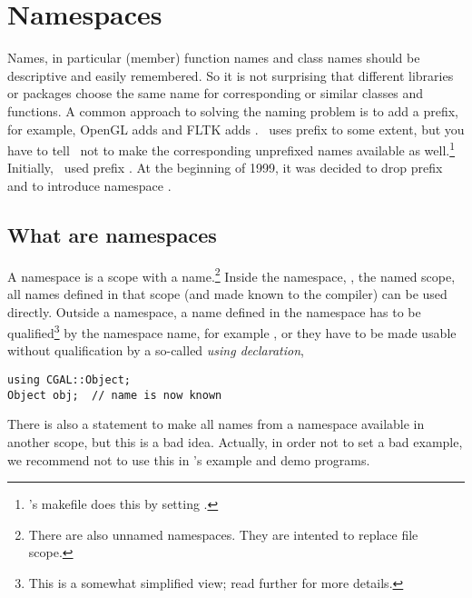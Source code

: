 
\chapter{Namespaces\label{chap:namespaces}}

Names, in particular (member) function names and class names should 
be descriptive and easily remembered. So it is not surprising that
different libraries or packages choose the same name for corresponding
or similar classes and functions. A common approach to solving the
naming problem is to add a prefix, for example, 
OpenGL adds 
and FLTK adds . \leda\ uses prefix %
to some extent, 
but you have to tell \leda\ not to make the corresponding unprefixed names 
available as well.\footnote{\cgal's
makefile does this by setting .} Initially, \cgal\ used
prefix . 
At the beginning of 1999, it was decided to drop prefix  and to 
introduce namespace . 

\section{What are namespaces}
A namespace
is a scope with a name.\footnote{There are also unnamed namespaces.
They are intented to replace file scope.} Inside the namespace, \ie, the
named scope, all names defined in that scope (and made known to the compiler) 
can be used directly. Outside a namespace, a name defined in the namespace
has to be qualified\footnote{This is a somewhat simplified view; read further
for more details.} by the namespace name, for example ,%
or they have to be made usable without qualification by a so-called 
{\em using declaration},
\begin{verbatim}
using CGAL::Object;
Object obj;  // name is now known
\end{verbatim}
There is also a statement to make all names from a namespace available in
another scope, but this is a bad idea. Actually, in order not to set a bad
example, we recommend not to use this in \cgal's example and demo programs.


